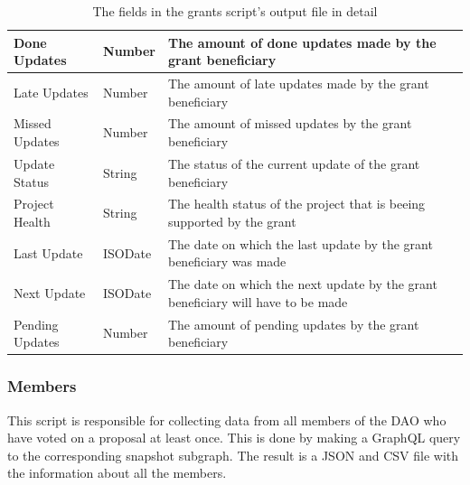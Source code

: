\documentclass[MSE,Master,english]{twbook}%
\begin{document}
\begin{table}[H]
{\begin{tabular}{|l|l|l|}
  Done Updates                   & Number  & The amount of done updates made by the grant beneficiary                               \\ \hline
  Late Updates                   & Number  & The amount of late updates made by the grant beneficiary                               \\ \hline
  Missed Updates                 & Number  & The amount of missed updates by the grant beneficiary                                  \\ \hline
  Update Status                  & String  & The status of the current update of the grant beneficiary                              \\ \hline
  Project Health                 & String  & The health status of the project that is beeing supported by the grant                 \\ \hline
  Last Update                    & ISODate & The date on which the last update by the grant beneficiary was made                    \\ \hline
  Next Update                    & ISODate & The date on which the next update by the grant beneficiary will have to be made        \\ \hline
  Pending Updates                & Number  & The amount of pending updates by the grant beneficiary                                 \\ \hline
  \end{tabular}%
  }
  \caption{The fields in the grants script's output file in detail}
  \label{table:grants}
\end{table}

\subsubsection{Members}
This script is responsible for collecting data from all members of the DAO who have voted on a proposal at least once. This is done by making a GraphQL query to the corresponding snapshot subgraph. The result is a JSON and CSV file with the information about all the members. \\
\end{document}
